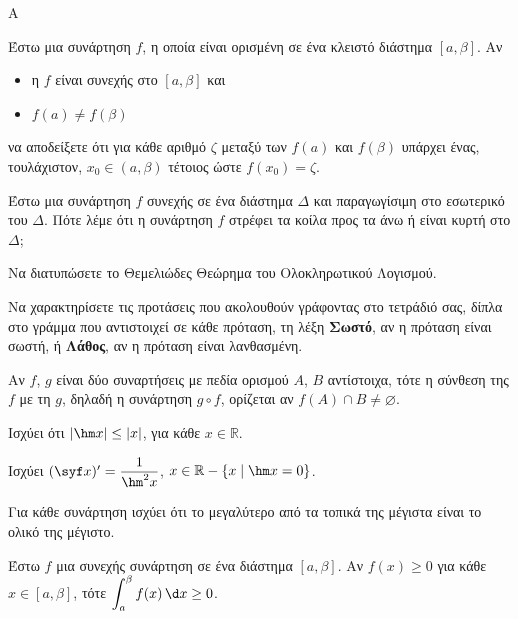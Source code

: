 \begin{thema}{Α}
\begin{erwthma}
    \item Έστω μια συνάρτηση $f$, η οποία είναι ορισμένη σε ένα κλειστό διάστημα $[a, \beta]$. Αν
    \begin{itemize}
        \item η $f$ είναι συνεχής στο $[a, \beta]$ και
        \item $f(a) \neq f(\beta)$
    \end{itemize}
    να αποδείξετε ότι για κάθε αριθμό $\zeta$ μεταξύ των $f(a)$ και $f(\beta)$ υπάρχει ένας, τουλάχιστον, $x_0 \in (a, \beta)$ τέτοιος ώστε $f(x_0) = \zeta$. 

    \item Έστω μια συνάρτηση $f$ συνεχής σε ένα διάστημα $\Delta$ και παραγωγίσιμη στο εσωτερικό του $\Delta$. Πότε λέμε ότι η συνάρτηση $f$ στρέφει τα κοίλα προς τα άνω ή είναι κυρτή στο $\Delta$; 

    \item Να διατυπώσετε το Θεμελιώδες Θεώρημα του Ολοκληρωτικού Λογισμού. 

    \item Να χαρακτηρίσετε τις προτάσεις που ακολουθούν γράφοντας στο τετράδιό σας, δίπλα στο γράμμα που αντιστοιχεί σε κάθε πρόταση, τη λέξη \textbf{Σωστό}, αν η πρόταση είναι σωστή, ή \textbf{Λάθος}, αν η πρόταση είναι λανθασμένη.
    \begin{alist}
        \item Αν $f$, $g$ είναι δύο συναρτήσεις με πεδία ορισμού $A$, $B$ αντίστοιχα, τότε η σύνθεση της $f$ με τη $g$, δηλαδή η συνάρτηση $g \circ f$, ορίζεται αν $f(A) \cap B \neq \varnothing$.

        \item Ισχύει ότι $|\hm x| \leq |x|$, για κάθε $x \in \mathbb{R}$.

        \item Ισχύει $(\syf x)' = \dfrac{1}{\hm^2 x}$, $x \in \mathbb{R} - \{x \mid \hm x = 0\}$.

        \item Για κάθε συνάρτηση ισχύει ότι το μεγαλύτερο από τα τοπικά της μέγιστα είναι το ολικό της μέγιστο.

        \item Έστω $f$ μια συνεχής συνάρτηση σε ένα διάστημα $[a, \beta]$. Αν $f(x) \geq 0$ για κάθε $x \in [a, \beta]$, τότε $\displaystyle\int_a^\beta f(x)\,\d x \geq 0$.
    \end{alist}
\end{erwthma}
\end{thema}

